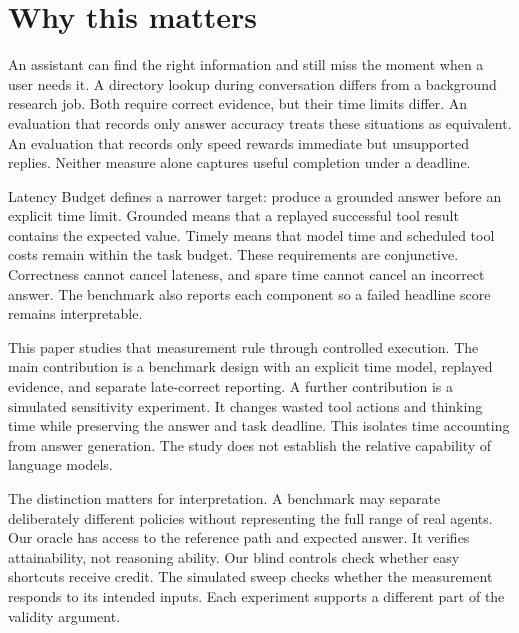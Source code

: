 \documentclass{article}
\title{\PaperTitle}
\author{Pooria Arab\\Independent researcher\\ORCID \texttt{\AuthorOrcid}}
\begin{document}
\maketitle
\begin{abstract}
\PaperAbstract
\end{abstract}
\section{Why this matters}
An assistant can find the right information and still miss the moment when a user needs it. A directory lookup during conversation differs from a background research job. Both require correct evidence, but their time limits differ. An evaluation that records only answer accuracy treats these situations as equivalent. An evaluation that records only speed rewards immediate but unsupported replies. Neither measure alone captures useful completion under a deadline.\par
Latency Budget defines a narrower target: produce a grounded answer before an explicit time limit. Grounded means that a replayed successful tool result contains the expected value. Timely means that model time and scheduled tool costs remain within the task budget. These requirements are conjunctive. Correctness cannot cancel lateness, and spare time cannot cancel an incorrect answer. The benchmark also reports each component so a failed headline score remains interpretable.\par
This paper studies that measurement rule through controlled execution. The main contribution is a benchmark design with an explicit time model, replayed evidence, and separate late-correct reporting. A further contribution is a simulated sensitivity experiment. It changes wasted tool actions and thinking time while preserving the answer and task deadline. This isolates time accounting from answer generation. The study does not establish the relative capability of language models.\par
The distinction matters for interpretation. A benchmark may separate deliberately different policies without representing the full range of real agents. Our oracle has access to the reference path and expected answer. It verifies attainability, not reasoning ability. Our blind controls check whether easy shortcuts receive credit. The simulated sweep checks whether the measurement responds to its intended inputs. Each experiment supports a different part of the validity argument.\par
\end{document}
